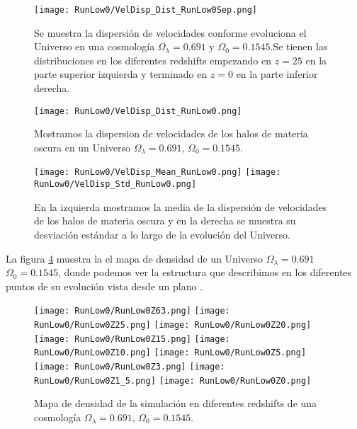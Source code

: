 \begin{figure}[H]
    \centering
    \texttt{[image: RunLow0/VelDisp\_Dist\_RunLow0Sep.png]}
    \caption[Dispersión de velocidades]{\footnotesize Se muestra la dispersión de velocidades conforme evoluciona el Universo en una cosmología $\Omega_\lambda = 0.691$ y $\Omega_0 = 0.1545$.Se tienen las distribuciones en los diferentes redshifts empezando en $z=25$ en la parte superior izquierda y terminado en $z=0$ en la parte inferior derecha.}
    \label{fig:Low0-VelDispDistSep}
\end{figure}

\begin{figure}[H]
    \centering
    \texttt{[image: RunLow0/VelDisp\_Dist\_RunLow0.png]}
    \caption[Distribución de la dispersión de velocidades]{\footnotesize Mostramos la dispersion de velocidades de los halos de materia oscura en un Universo $\Omega_\lambda = 0.691$, $\Omega_0 = 0.1545$.}
    \label{fig:Low0-VelDispDist}
\end{figure}

\begin{figure}[H]
    \centering
    \texttt{[image: RunLow0/VelDisp\_Mean\_RunLow0.png]}
    \texttt{[image: RunLow0/VelDisp\_Std\_RunLow0.png]}
    \caption[Media y desviación estándar de la dispersión de velocidades]{\footnotesize En la izquierda mostramos la media de la dispersión de velocidades de los halos de materia oscura y en la derecha se muestra su desviación estándar a lo largo de la evolución del Universo.}
    \label{fig:Low0-VelDispStats}
\end{figure}

La figura \ref{fig:Low0-DensityMap} muestra la el mapa de densidad de un Universo $\Omega_\lambda = 0.691$ $\Omega_0 = 0.1545$, donde podemos ver la estructura que describimos  en los diferentes puntos de su evolución vista desde un plano .
\begin{figure}[H]
    \centering

    \texttt{[image: RunLow0/RunLow0Z63.png]}   %
    \texttt{[image: RunLow0/RunLow0Z25.png]}   %
    \texttt{[image: RunLow0/RunLow0Z20.png]}   %
    \\
    \texttt{[image: RunLow0/RunLow0Z15.png]}   %
    \texttt{[image: RunLow0/RunLow0Z10.png]}   %
    \texttt{[image: RunLow0/RunLow0Z5.png]}    %
    \\
    \texttt{[image: RunLow0/RunLow0Z3.png]}    %
    \texttt{[image: RunLow0/RunLow0Z1\_5.png]}  %
    \texttt{[image: RunLow0/RunLow0Z0.png]}    %
    \caption[Mapa de densidad de un Universo en en diferentes redshift]{ \footnotesize Mapa de densidad de la simulación en diferentes redshifts de una cosmología $\Omega_\lambda = 0.691$, $\Omega_0 = 0.1545$. }
    \label{fig:Low0-DensityMap}
\end{figure}

